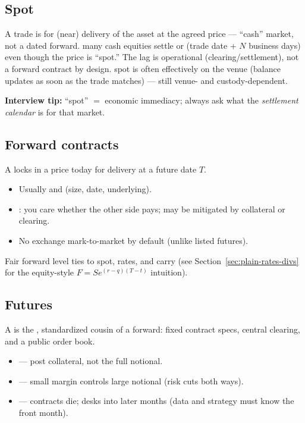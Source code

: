 \subsection{Spot}
\label{subsec:spot}
A  trade is for (near)  delivery of the asset 
at the agreed price --- ``cash'' market, not a dated forward.
\newline
{} many cash equities settle  or 
 (trade date + $N$ business days) even though the price is ``spot.'' 
The lag is operational (clearing/settlement), not a forward contract by design.
\newline
{} spot is often effectively  on the venue 
(balance updates as soon as the trade matches) --- still venue- and custody-dependent.
\par\noindent\textbf{Interview tip:} ``spot'' $=$ economic immediacy; always ask 
what the \emph{settlement calendar} is for that market.

\subsection{Forward contracts}
\label{subsec:forwards}
A  locks in a price today for delivery at a future date $T$.
\begin{itemize}
    \item Usually  and  (size, date, underlying).
    \item {}: you care whether the other side pays; may be 
          mitigated by collateral or clearing.
    \item No exchange mark-to-market by default (unlike listed futures).
\end{itemize}
Fair forward level ties to spot, rates, and carry (see Section~\ref{sec:plain-rates-divs} 
for the equity-style $F = S e^{(r-q)(T-t)}$ intuition).

\subsection{Futures}
\label{subsec:futures}
A  is the , standardized cousin of a 
forward: fixed contract specs, central clearing, and a public order book.
\begin{itemize}
    \item {} --- post collateral, not the full notional.
    \item {} --- small margin controls large notional (risk cuts 
          both ways).
    \item {} --- contracts die; desks  into later 
          months (data and strategy must know the front month).
\end{itemize}

